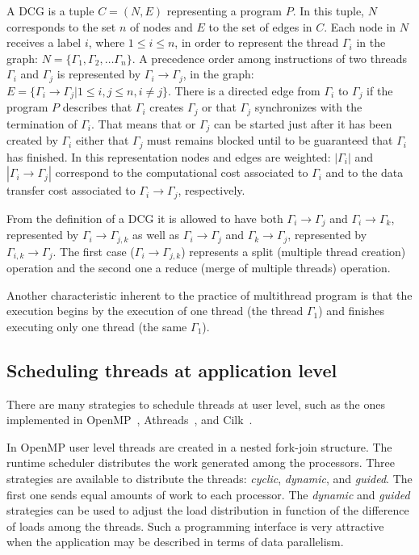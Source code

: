 \documentclass[twocolumn]{svjour3}
\begin{document}
\begin{definition}
A DCG is a tuple $C = (N, E) $ representing a program $P$. In this tuple, $N$ corresponds to the set $n$ of nodes and $E$ to the set of edges in $C$.
Each node in $N$ receives a label $i$, where $1 \le i \le n$, in order to represent the thread $\Gamma_i$ in the graph: $N = \{\Gamma_1, \Gamma_2, … \Gamma_n\}$.
A precedence order among instructions of two threads $\Gamma_i$ and $\Gamma_j$ is represented by $\Gamma_i \rightarrow \Gamma_j$, in the graph: $E = \{\Gamma_i \rightarrow \Gamma_j | 1 \le i,j \le n, i \neq j\}$.
There is a directed edge from $\Gamma_i$ to $\Gamma_j$ if the program $P$ describes that $\Gamma_i$ creates $\Gamma_j$ or that $\Gamma_j$ synchronizes with the termination of $\Gamma_i$. That means that or $\Gamma_j$ can be started just after it has been created by $\Gamma_i$ either that $\Gamma_j$ must remains blocked until to be guaranteed that $\Gamma_i$ has finished.
In this representation nodes and edges are weighted: $|\Gamma_i|$ and $|\Gamma_i \rightarrow \Gamma_j|$ correspond to the computational cost associated to $\Gamma_i$ and to the data transfer cost associated to $\Gamma_i \rightarrow \Gamma_j$, respectively.
\end{definition}

From the definition of a DCG it is allowed to have both $\Gamma_i \rightarrow \Gamma_j$ and $\Gamma_i \rightarrow \Gamma_k$, represented by $\Gamma_i \rightarrow \Gamma_{j,k}$ as well as $\Gamma_i \rightarrow \Gamma_j$ and $\Gamma_k \rightarrow \Gamma_j$, represented by $\Gamma_{i,k} \rightarrow \Gamma_j$. The first case ($\Gamma_i \rightarrow \Gamma_{j,k}$) represents a split (multiple thread creation) operation and the second one a reduce (merge of multiple threads) operation.

Another characteristic inherent to the practice of multithread program is that the execution begins by the execution of one thread (the thread $\Gamma_1$) and finishes executing only one thread (the same $\Gamma_1$).

\subsection{Scheduling threads at application level}

There are many strategies to schedule threads at user level, such as the ones implemented in OpenMP~\cite{ChandraOpenMP}, Athreads~\cite{Vicosa07}, and Cilk~\cite{Cilk95}.

In OpenMP user level threads are created in a nested fork-join structure. The runtime scheduler distributes the work generated among the processors. Three strategies are available to distribute the threads: \emph{cyclic}, \emph{dynamic}, and \emph{guided}. The first one sends equal amounts of work to each processor. The \emph{dynamic} and \emph{guided} strategies can be used to adjust the load distribution in function of the difference of loads among the threads. Such a programming interface is very attractive when the application may be described in terms of data parallelism.
\end{document}
